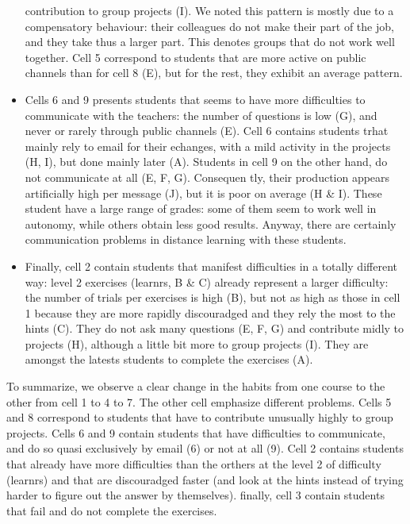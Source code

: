 \documentclass[
]{article}
\begin{document}
\begin{itemize}
  contribution to group projects (I). We noted this pattern is mostly
  due to a compensatory behaviour: their colleagues do not make their
  part of the job, and they take thus a larger part. This denotes groups
  that do not work well together. Cell 5 correspond to students that are
  more active on public channels than for cell 8 (E), but for the rest,
  they exhibit an average pattern.
\item
  Cells 6 and 9 presents students that seems to have more difficulties
  to communicate with the teachers: the number of questions is low (G),
  and never or rarely through public channels (E). Cell 6 contains
  students trhat mainly rely to email for their echanges, with a mild
  activity in the projects (H, I), but done mainly later (A). Students
  in cell 9 on the other hand, do not communicate at all (E, F, G).
  Consequen tly, their production appears artificially high per message
  (J), but it is poor on average (H \& I). These student have a large
  range of grades: some of them seem to work well in autonomy, while
  others obtain less good results. Anyway, there are certainly
  communication problems in distance learning with these students.
\item
  Finally, cell 2 contain students that manifest difficulties in a
  totally different way: level 2 exercises (learnrs, B \& C) already
  represent a larger difficulty: the number of trials per exercises is
  high (B), but not as high as those in cell 1 because they are more
  rapidly discouradged and they rely the most to the hints (C). They do
  not ask many questions (E, F, G) and contribute midly to projects (H),
  although a little bit more to group projects (I). They are amongst the
  latests students to complete the exercises (A).
\end{itemize}

To summarize, we observe a clear change in the habits from one course to
the other from cell 1 to 4 to 7. The other cell emphasize different
problems. Cells 5 and 8 correspond to students that have to contribute
unusually highly to group projects. Cells 6 and 9 contain students that
have difficulties to communicate, and do so quasi exclusively by email
(6) or not at all (9). Cell 2 contains students that already have more
difficulties than the orthers at the level 2 of difficulty (learnrs) and
that are discouradged faster (and look at the hints instead of trying
harder to figure out the answer by themselves). finally, cell 3 contain
students that fail and do not complete the exercises.
\end{document}
